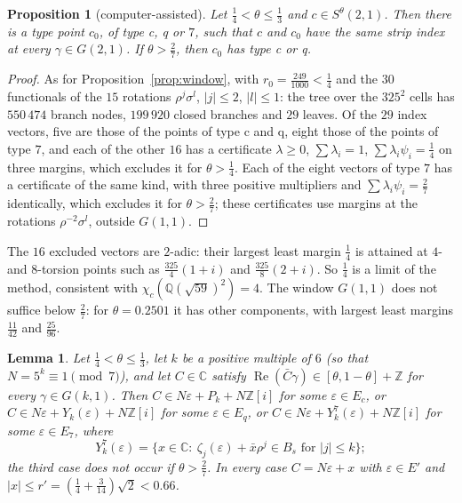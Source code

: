 \documentclass[11pt,a4paper]{amsart}
\newtheorem{lemma}{Lemma}
\newtheorem{proposition}{Proposition}
\theoremstyle{remark}
\newcommand{\Q}{\mathbb{Q}}
\newcommand{\Z}{\mathbb{Z}}
\newcommand{\C}{\mathbb{C}}
\begin{document}
\begin{proposition}[computer-assisted]\label{prop:window7}
Let $\frac14<\theta\le\frac13$ and $c\in S^\theta(2,1)$. Then there is a type point $c_0$, of type c, q or $7$,
such that $c$ and $c_0$ have the same strip index at every $\gamma\in G(2,1)$. If $\theta>\frac27$, then $c_0$ has
type c or q.
\end{proposition}

\begin{proof}
As for Proposition~\ref{prop:window}, with $r_0=\frac{249}{1000}<\frac14$ and the $30$ functionals of the $15$
rotations $\rho^j\sigma^l$, $|j|\le2$, $|l|\le1$: the tree over the $325^2$ cells has $550\,474$ branch nodes,
$199\,920$ closed branches and $29$ leaves. Of the $29$ index vectors, five are those of the points of type c and q,
eight those of the points of type $7$, and each of the other $16$ has a certificate $\lambda\ge0$, $\sum\lambda_i=1$,
$\sum\lambda_i\psi_i=\frac14$ on three margins, which excludes it for $\theta>\frac14$. Each of the eight vectors of
type $7$ has a certificate of the same kind, with three positive multipliers and $\sum\lambda_i\psi_i=\frac27$
identically, which excludes it for $\theta>\frac27$; these certificates use margins at the rotations $\rho^{-2}\sigma^l$, outside $G(1,1)$.
\end{proof}

The $16$ excluded vectors are $2$-adic: their largest least margin $\frac14$ is attained at $4$- and $8$-torsion
points such as $\frac{325}4(1+i)$ and $\frac{325}8(2+i)$. So $\frac14$ is a limit of the method, consistent with
$\chi_c(\Q(\sqrt{59})^2)=4$. The window $G(1,1)$ does not suffice below $\frac27$: for $\theta=0.2501$ it has other
components, with largest least margins $\frac{11}{42}$ and $\frac{25}{96}$.

\begin{lemma}\label{lem:window7}
Let $\frac14<\theta\le\frac13$, let $k$ be a positive multiple of $6$ \textup{(}so that $N=5^k\equiv1\pmod7$\textup{)},
and let $C\in\C$ satisfy $\operatorname{Re}(\bar C\gamma)\in[\theta,1-\theta]+\Z$ for every $\gamma\in G(k,1)$. Then
$C\in N\varepsilon+P_k+N\Z[i]$ for some $\varepsilon\in E_c$, or $C\in N\varepsilon+Y_k(\varepsilon)+N\Z[i]$ for some
$\varepsilon\in E_q$, or $C\in N\varepsilon+Y^7_k(\varepsilon)+N\Z[i]$ for some $\varepsilon\in E_7$, where
\[
Y^7_k(\varepsilon)=\{x\in\C:\ \zeta_j(\varepsilon)+\bar x\rho^j\in B_s\text{ for }|j|\le k\};
\]
the third case does not occur if $\theta>\frac27$. In every case $C=N\varepsilon+x$ with $\varepsilon\in E'$ and
$|x|\le r'=(\frac14+\frac3{14})\sqrt2<0.66$.
\end{lemma}
\end{document}
